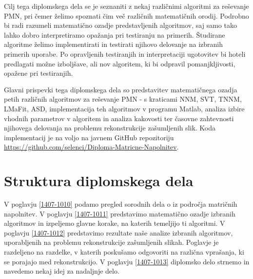 Cilj tega 
diplomskega dela se je seznaniti z nekaj različnimi algoritmi
za reševanje PMN, pri čemer 
želimo spoznati čim več različnih matematičnih orodij.
Podrobno bi radi razumeli matematično ozadje predstavljenih algoritmov, saj samo tako lahko dobro interpretiramo opažanja pri testiranju na primerih.
Študirane algoritme želimo implementirati in testirati njihovo delovanje na izbranih primerih uporabe. Po opravljenih testiranjih in interpretaciji ugotovitev bi hoteli predlagati možne izboljšave, ali nov algoritem, ki bi odpravil pomanjkljivosti, opažene pri testiranjih. 

Glavni prispevki tega diplomskega dela so 
predstavitev matematičnega ozadja petih različnih algoritmov za reševanje PMN - s kraticami NNM, SVT, TNNM, LMaFit, ASD,
implementacija teh algoritmov v programu Matlab, analiza izbire vhodnih parametrov v algoritem in analiza kakovosti ter časovne zahtevnosti njihovega delovanja na  problemu rekonstrukcije zašumljenih slik. Koda implementacij je na voljo na javnem GitHub repozitoriju \url{https://github.com/selenci/Diploma-Matricne-Napolnitev}.

\iffalse
Cilj diplomske naloge je predstaviti uporabnost algoritmov, ter razložiti zakaj delujejo. Ideje različnih algoritmov ter njihove pristope do problema poskušamo kar se da jasno predstaviti in interpretirati.
\fi

\iffalse
Glavni prispevki te diplomske naloge so implementacija vseh omenjenih algoritmov, testiranje algoritmov na različnih primerih ter odgovori na vprašanja o uporabnosti metod, ki se nam med implementacijo porodijo. Podamo tudi vizualen prikaz rekonstruiranih slik, kot tudi grafičen prikaz napak in časov do konvergence programov.
\fi

\section{Struktura diplomskega dela}

V poglavju \ref{1407-1010} podamo pregled sorodnih dela o iz področja matričnih napolnitev. V poglavju \ref{1407-1011} predstavimo matematično ozadje izbranih algoritmov in izpeljemo glavne korake, na katerih temeljijo ti algoritmi. V poglavju \ref{1407-1012} predstavimo rezultate naše analize izbranih algoritmov, uporabljenih na problemu rekonstrukcije zašumljenih slikah. Poglavje je razdeljeno na razdelke, v katerih poskušamo odgovoriti na različna vprašanja, ki se porajajo med rekonstrukcijo. V poglavju \ref{1407-1013} diplomsko delo strnemo in navedemo nekaj idej za nadaljnje delo.
